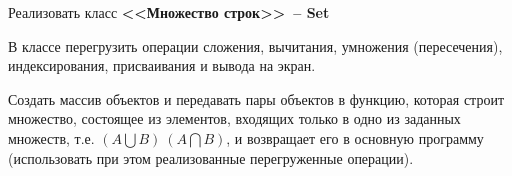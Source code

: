 
Реализовать класс \textbf{<<Множество строк>>~-- Set}

В классе перегрузить операции сложения, вычитания,
умножения (пересечения), индексирования, присваивания и вывода на экран.

Создать
массив объектов и передавать пары объектов в функцию, которая строит множество,
состоящее из элементов, входящих только в одно из заданных множеств,
т.е. $(A\bigcup B) \ (A\bigcap B)$, и возвращает его в основную программу (использовать при этом
реализованные перегруженные операции).
